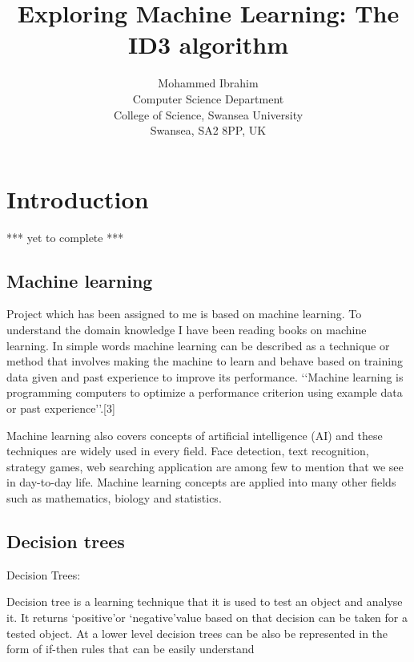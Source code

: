 \documentclass{article}
\begin{document}
\title{Exploring Machine Learning: The ID3 algorithm}

\author{Mohammed Ibrahim\\
 Computer Science Department\\
  College of Science, Swansea University\\
  Swansea, SA2 8PP, UK
}

\maketitle

\tableofcontents

\section{Introduction}
\label{sec:int}

*** yet to complete ***

\subsection{Machine learning}
\label{sec:machinelearn}

Project which has been assigned to me is based on machine learning\@. To understand the domain knowledge I have been reading books on machine learning\@. In simple words machine learning can be described as a technique or method that involves making the machine to learn and behave based on training data given and past experience to improve its performance. \lq\lq Machine learning is programming computers to optimize a performance criterion using example data or past experience\rq\rq.[3]

Machine learning also covers concepts of artificial intelligence (AI) and these techniques are widely used in every field. Face detection, text recognition, strategy games, web searching application are among few to mention that we see in day-to-day life. Machine learning concepts are applied into many other fields such as mathematics, biology and statistics. 

\subsection{Decision trees}
\label{sec:dectree}

Decision Trees:

Decision tree is a learning technique that it is used to test an object and analyse it. It returns \lq positive\rq or \lq negative\rq value based on that decision can be taken for a tested object. At a lower level decision trees can be also be represented in the form of if-then rules that can be easily understand
\end{document}
